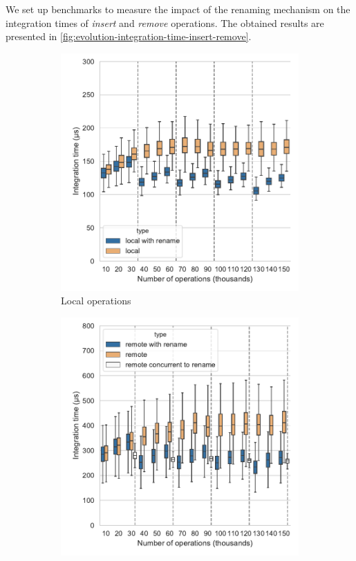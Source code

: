 \documentclass[sigplan,10pt]{acmart}
\begin{document}
\begin{sloppypar}
We set up benchmarks to measure the impact of the renaming mechanism on the integration times of \emph{insert} and \emph{remove} operations.
The obtained results are presented in \autoref{fig:evolution-integration-time-insert-remove}.
\end{sloppypar}

\begin{figure}[ht!]
    \begin{subfigure}{\columnwidth}
        \centering
        \includegraphics[width=0.9\columnwidth]{img/integration-time-boxplot-local-operations-without-outliers.pdf}
        \caption{Local operations}
        \label{fig:evolution-integration-time-local-insert-remove}
    \end{subfigure}
    \begin{subfigure}{\columnwidth}
        \centering
        \includegraphics[width=0.9\columnwidth]{img/integration-time-boxplot-remote-operations-without-outliers.pdf}

\end{subfigure}
\end{figure}
\end{document}
